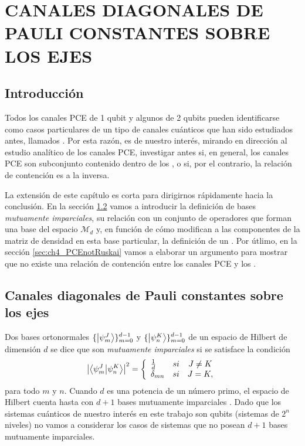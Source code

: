 \chapter{CANALES DIAGONALES DE PAULI CONSTANTES SOBRE LOS EJES}

\section{Introducción} %
Todos los canales PCE de 1 qubit y algunos de 2 qubits pueden identificarse como
casos particulares de un tipo de canales cuánticos que han sido 
estudiados antes, llamados
\ruskai{} \cite{nathanson2007pauli}. Por esta razón, es de nuestro interés,
mirando en dirección al estudio analítico de los canales PCE, investigar antes
si, en general, los canales PCE son subconjunto contenido dentro de los 
\ruskai{}, o si, por el contrario, la relación de contención es a la inversa.

La extensión de este capítulo es corta para dirigirnos rápidamente 
hacia la conclusión. En la sección \ref{sec:ch4_ruskai} vamos a introducir la 
definición de bases \textit{mutuamente imparciales}, su relación con un
conjunto de operadores que forman una base del espacio $\mathcal{M}_d$  y,
en función de cómo modifican a las componentes de la matriz de densidad 
en esta base particular, la definición de un \ruskaiMap{}. Por útlimo, en la sección 
\ref{sec:ch4_PCEnotRuskai} vamos a elaborar un argumento para mostrar 
que no existe una relación de contención entre los canales PCE y los \ruskai{}.


\section{Canales diagonales de Pauli constantes sobre los ejes} \label{sec:ch4_ruskai} %
Dos bases ortonormales $\{\ket{\psi_m^J}\}_{m=0}^{d-1}$
y $\{\ket{\psi_n^K}\}_{m=0}^{d-1}$ de un espacio de Hilbert
de dimensión $d$ se dice que son \textit{mutuamente 
imparciales} si se satisface la 
condición~\cite{bengtsson_zyczkowski_2017,nathanson2007pauli}
\begin{align}\label{eq:mub_definition}
	\abs{\braket{\psi_m^J}{\psi_n^K}}^2=
	\left\{ \begin{array}{lcc}
             \frac{1}{d} & si & J\ne K \\
             \delta_{mn} & si & J=K,
             \end{array}
   \right.
\end{align}
para todo $m$ y $n$. Cuando $d$  es una potencia de un 
número primo, el espacio de Hilbert cuenta hasta con $d+1$ bases mutuamente
imparciales \cite{durt2010mutually}. 
Dado que los sistemas cuánticos de nuestro interés en este trabajo son qubits 
(sistemas de $2^n$ niveles) no vamos a considerar los casos de sistemas que 
no posean $d+1$ bases mutuamente imparciales. 

